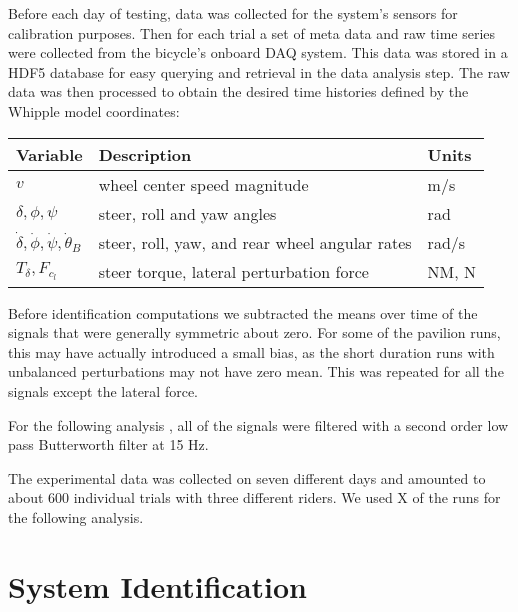 \documentclass[a4paper]{article}
\begin{document}

Before each day of testing, data was collected for the system's sensors for
calibration purposes. Then for each trial a set of meta data and raw time
series were collected from the bicycle's onboard DAQ system. This data was
stored in a HDF5 database for easy querying and retrieval in the data analysis
step. The raw data was then processed to obtain the desired time histories
defined by the Whipple model coordinates:

\begin{table}
  \begin{tabular}{lll}
    Variable                                            & Description                                    & Units \\
    \hline
    $v$                                                 & wheel center speed magnitude                   & m/s \\
    $\delta,\phi,\psi$                                  & steer, roll and yaw angles                     & rad \\
    $\dot{\delta},\dot{\phi},\dot{\psi},\dot{\theta}_B$ & steer, roll, yaw, and rear wheel angular rates & rad/s \\
    $T_\delta,F_{c_l}$                                  & steer torque, lateral perturbation force       & NM, N
  \end{tabular}
\end{table}

Before identification computations we subtracted the means over time of the
signals that were generally symmetric about zero. For some of the pavilion
runs, this may have actually introduced a small bias, as the short duration
runs with unbalanced perturbations may not have zero mean. This was repeated 
for all the signals except the lateral force.

For the following analysis%
, all of the signals were filtered with a second order
low pass Butterworth filter at 15 Hz. 


The experimental data was collected on seven different days and amounted to
about 600 individual trials with three different riders. We used X of the 
runs for the following analysis.

\section{System Identification}
\end{document}
